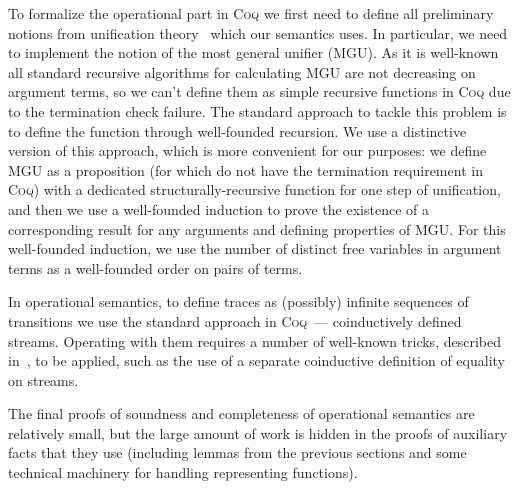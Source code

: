 To formalize the operational part in \textsc{Coq} we first need to define all preliminary notions from unification theory~\cite{Unification} which our semantics uses. In particular, we need to implement the notion of the most general unifier (MGU). As it is well-known~\cite{StructuralMGU} all standard recursive algorithms for calculating MGU are not decreasing on argument terms, so we can't define them as simple recursive functions in \textsc{Coq} due to the termination check failure. The standard approach to tackle this problem is to define the function through well-founded recursion. We use a distinctive version of this approach, which is more convenient for our purposes: we define MGU as a proposition (for which do not have the termination requirement in \textsc{Coq}) with a dedicated structurally-recursive function for one step of unification, and then we use a well-founded induction to prove the existence of a corresponding result for any arguments and defining properties of MGU. For this well-founded induction, we use the number of distinct free variables in argument terms as a well-founded order on pairs of terms.

In operational semantics, to define traces as (possibly) infinite sequences of transitions we use the standard approach in \textsc{Coq}~--- coinductively defined streams. Operating with them requires a number of well-known tricks, described in~\cite{CPDT}, to be applied, such as the use of a separate coinductive definition of equality on streams.

The final proofs of soundness and completeness of operational semantics are relatively small, but the large amount of work is hidden in the proofs of auxiliary facts that they use (including lemmas from the previous sections and some technical machinery for handling representing functions).
